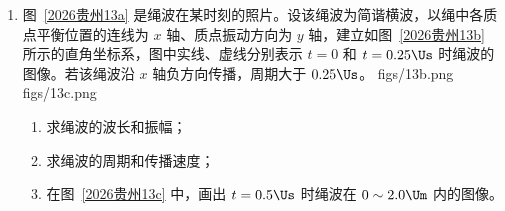 \documentclass[\gkver]{gaokaozhenti}
\begin{document}
\begin{enumerate}
{解得 $R_{x}=\frac{U_{1}R_{0}R_{V1}}{R_{V1}U_{2}-(R_{0}+R_{V1})U_{1}}$
}
\item
图~\ref{2026贵州13a} 是绳波在某时刻的照片。设该绳波为简谐横波，以绳中各质点平衡位置的连线为 $x$ 轴、质点振动方向为 $y$ 轴，建立如图~\ref{2026贵州13b} 所示的直角坐标系，图中实线、虚线分别表示 $t=0$ 和 $t=0.25\Us$ 时绳波的图像。若该绳波沿 $x$ 轴负方向传播，周期大于 $0.25\Us$。
{figs/13b.png}
{figs/13c.png}
\begin{enumerate}
	\item
	求绳波的波长和振幅；
	\item
	求绳波的周期和传播速度；
	\item
	在图~\ref{2026贵州13c} 中，画出 $t=0.5\Us$ 时绳波在 $0\sim2.0\Um$ 内的图像。
\end{enumerate}

\end{enumerate}
\end{document}

